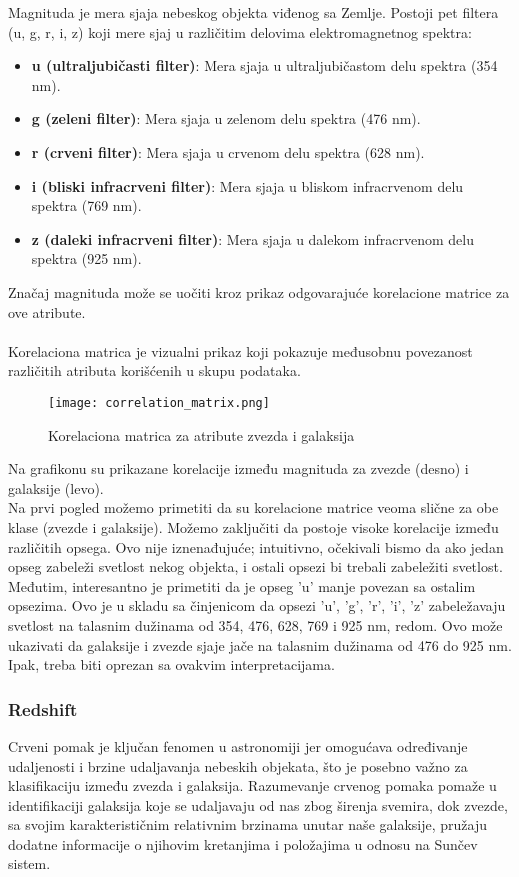 \documentclass[a4paper,12pt]{article}
\begin{document}
Magnituda je mera sjaja nebeskog objekta viđenog sa Zemlje. Postoji pet filtera (u, g, r, i, z) koji mere sjaj u različitim delovima elektromagnetnog spektra:

\begin{itemize}
    \item \textbf{u (ultraljubičasti filter)}: Mera sjaja u ultraljubičastom delu spektra (354 nm).
    \item \textbf{g (zeleni filter)}: Mera sjaja u zelenom delu spektra (476 nm).
    \item \textbf{r (crveni filter)}: Mera sjaja u crvenom delu spektra (628 nm).
    \item \textbf{i (bliski infracrveni filter)}: Mera sjaja u bliskom infracrvenom delu spektra (769 nm).
    \item \textbf{z (daleki infracrveni filter)}: Mera sjaja u dalekom infracrvenom delu spektra (925 nm).
\end{itemize}
Značaj magnituda može se uočiti kroz prikaz odgovarajuće korelacione matrice za ove atribute.
\\\\Korelaciona matrica je vizualni prikaz koji pokazuje međusobnu povezanost različitih atributa korišćenih u skupu podataka.

\begin{figure}[H]
\centering
\texttt{[image: correlation\_matrix.png]}
\caption{Korelaciona matrica za atribute zvezda i galaksija}
\label{fig:correlation_matrix}
\end{figure}

Na grafikonu su prikazane korelacije između magnituda za zvezde (desno) i galaksije (levo).
\\Na prvi pogled možemo primetiti da su korelacione matrice veoma slične za obe klase (zvezde i galaksije). Možemo zaključiti da postoje visoke korelacije između različitih opsega. Ovo nije iznenađujuće; intuitivno, očekivali bismo da ako jedan opseg zabeleži svetlost nekog objekta, i ostali opsezi bi trebali zabeležiti svetlost. Međutim, interesantno je primetiti da je opseg 'u' manje povezan sa ostalim opsezima. Ovo je u skladu sa činjenicom da opsezi 'u', 'g', 'r', 'i', 'z' zabeležavaju svetlost na talasnim dužinama od 354, 476, 628, 769 i 925 nm, redom. Ovo može ukazivati da galaksije i zvezde sjaje jače na talasnim dužinama od 476 do 925 nm. Ipak, treba biti oprezan sa ovakvim interpretacijama.

\subsubsection{Redshift}
Crveni pomak je ključan fenomen u astronomiji jer omogućava određivanje udaljenosti i brzine udaljavanja nebeskih objekata, što je posebno važno za klasifikaciju između zvezda i galaksija. Razumevanje crvenog pomaka pomaže u identifikaciji galaksija koje se udaljavaju od nas zbog širenja svemira, dok zvezde, sa svojim karakterističnim relativnim brzinama unutar naše galaksije, pružaju dodatne informacije o njihovim kretanjima i položajima u odnosu na Sunčev sistem.
\end{document}
